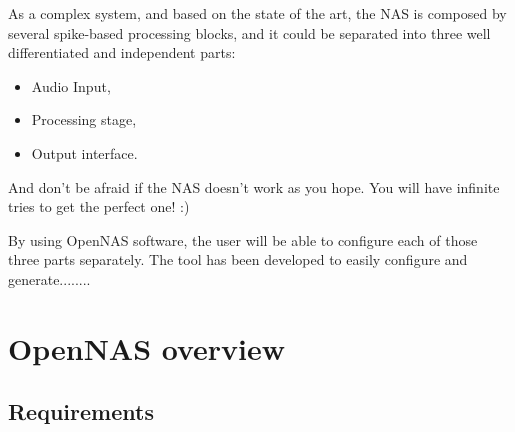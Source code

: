 
As a complex system, and based on the state of the art, the NAS is composed by several spike-based processing blocks, and it could be separated into three well differentiated and independent parts:
\begin{itemize}
\item Audio Input,
\item Processing stage,
\item Output interface.
\end{itemize}


And don't be afraid if the NAS doesn't work as you hope. You will have infinite tries to get the perfect one! :)


By using OpenNAS software, the user will be able to configure each of those three parts separately. The tool has been developed to easily configure and generate........ 


\section{OpenNAS overview}
\label{sec:Overview}

\subsection{Requirements}

